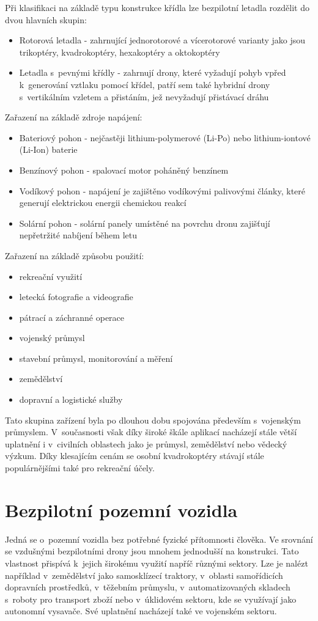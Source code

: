 \documentclass[12pt]{report}
\begin{document}
Při klasifikaci na základě typu konstrukce křídla lze bezpilotní letadla rozdělit do dvou hlavních skupin:
\begin{itemize}
	\item Rotorová letadla - zahrnující jednorotorové a vícerotorové varianty jako jsou trikoptéry, kvadrokoptéry, hexakoptéry a oktokoptéry
	\item Letadla s~pevnými křídly - zahrnují drony, které vyžadují pohyb vpřed k~generování vztlaku pomocí křídel, patří sem také hybridní drony s~vertikálním vzletem a přistáním, jež nevyžadují přistávací dráhu
\end{itemize}

Zařazení na základě zdroje napájení:
\begin{itemize}
	\item Bateriový pohon - nejčastěji lithium-polymerové (Li-Po) nebo lithium-iontové (Li-Ion) baterie
	\item Benzínový pohon - spalovací motor poháněný benzínem
	\item Vodíkový pohon - napájení je zajištěno vodíkovými palivovými články, které generují elektrickou energii chemickou reakcí
	\item Solární pohon - solární panely umístěné na povrchu dronu zajišťují nepřetržité nabíjení během letu
\end{itemize}

Zařazení na základě způsobu použití:
\begin{itemize}
	\item rekreační využití
	\item letecká fotografie a videografie
	\item pátrací a záchranné operace
	\item vojenský průmysl
	\item stavební průmysl, monitorování a měření
	\item zemědělství
	\item dopravní a logistické služby
\end{itemize}

Tato skupina zařízení byla po dlouhou dobu spojována především s~vojenským průmyslem. V~současnosti však díky široké škále aplikací nacházejí stále větší uplatnění i v~civilních oblastech jako je průmysl, zemědělství nebo vědecký výzkum. Díky klesajícím cenám se osobní kvadrokoptéry stávají stále populárnějšími také pro rekreační účely. \cite{mainbook} \cite{whatisadrone}

\section[Bezpilotní pozemní vozidla]{Bezpilotní pozemní vozidla}
Jedná se o~pozemní vozidla bez potřebné fyzické přítomnosti člověka. Ve srovnání se vzdušnými bezpilotními drony jsou mnohem jednodušší na konstrukci. Tato vlastnost přispívá k~jejich širokému využití napříč různými sektory. Lze je nalézt například v~zemědělství jako samosklízecí traktory, v~oblasti samořídicích dopravních prostředků, v~těžebním průmyslu, v~automatizovaných skladech s~roboty pro transport zboží nebo v~úklidovém sektoru, kde se využívají jako autonomní vysavače. Své uplatnění nacházejí také ve vojenském sektoru. \cite{mainbook}
\end{document}
